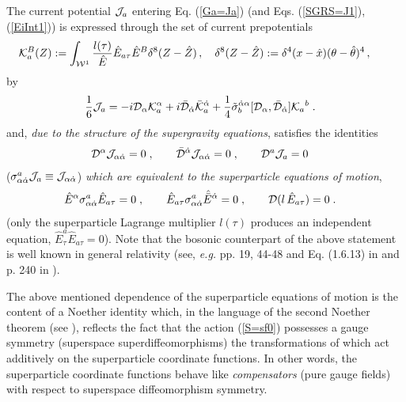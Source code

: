 \documentclass[a4paper,11pt]{article}
\begin{document}
The current potential ${\cal J}_a$ entering Eq. (\ref{Ga=Ja}) (and 
Eqs. (\ref{SGRS=J1}), (\ref{EiInt1})) 
is expressed through 
the set of current prepotentials 
\begin{eqnarray}
\label{K2,3/2}
& {\cal K}_a^{B}(Z):= \int_{{\cal W}^1}  
 {l(\tau )\over \hat{E}} \hat{E}_{a\tau} \hat{E}^{B} 
\delta^8(Z-\hat{Z})  \, , \quad \delta^8(Z-\hat{Z}) := \delta^4(x-\hat{x}) 
(\theta-\hat{\theta})^4 \, , \quad 
\end{eqnarray}
by  
\begin{eqnarray} 
\label{Ja=}
& {1\over 6}{\cal J}_a = - i {\cal D}_{\alpha} {\cal K}_a^{\alpha} 
+ i \bar{{\cal D}}_{\dot{\alpha}} \bar{{\cal K}}_a^{\dot{\alpha}} 
+ {1\over 4} \tilde{\sigma}_b^{ \dot{\alpha} {\alpha} }
[{\cal D}_{{\alpha}}, \bar{{\cal D}}_{\dot{\alpha}}] {\cal K}_a{}^b \; .
\end{eqnarray}
and, {\sl due to the structure of the supergravity equations},  
satisfies the identities 
 \begin{eqnarray}\label{DJa=0}
{\cal D}^{\alpha} {\cal J}_{\alpha\dot{\alpha}} = 0 \; , \qquad 
\bar{{\cal D}}^{\dot{\alpha}}{\cal J}_{\alpha\dot{\alpha}} = 0 \; , 
\qquad  {\cal D}^{a} {\cal J}_{a} = 0 \quad 
\end{eqnarray}
($\sigma_{\alpha\dot{\alpha}}^a {\cal J}_{a}
\equiv{\cal J}_{\alpha\dot{\alpha}}$)
{\sl which are equivalent to the superparticle equations of motion}, 
\begin{eqnarray}\label{fEqm}
&\hat{E}^\alpha  \sigma^a_{\alpha\dot{\alpha}} \hat{E}_{a\tau} =0 \; , \qquad 
\hat{E}_{a\tau} \sigma^a_{\alpha\dot{\alpha}} \hat{\bar{E}}{}^{\dot{\alpha}} 
= 0 \; ,  \qquad  
 {\cal D}(l\, \hat{E}_{a\tau}) = 0\; .  
\end{eqnarray}
(only the superparticle Lagrange multiplier $l(\tau)$ produces an independent
  equation, $\hat{E}^a_{\tau} \hat{E}_{a\tau}=0$). 
Note that the bosonic counterpart of the above statement is well known in 
general relativity (see, {\it e.g.} 
pp. 19, 44-48 and Eq. (1.6.13) in  \cite{Inf} and p. 240 in \cite{Fock}). 


The above mentioned dependence of 
the superparticle equations of motion is 
 the content of a Noether identity which, 
in the language of the second Noether theorem (see \cite{BdAI1,BdAI2}), 
reflects the fact that the action (\ref{S=sf0}) possesses a gauge symmetry 
(superspace superdiffeomorphisms) 
the transformations of which act additively on the superparticle coordinate 
functions. In other words, the superparticle coordinate functions behave 
like {\sl compensators} (pure gauge fields) with respect to 
superspace diffeomorphism symmetry. 
\end{document}
